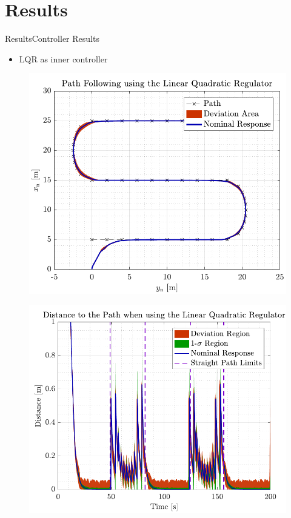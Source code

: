 \section{Results}

\begin{frame}{Results}{Controller Results}
\begin{itemize}
    \item LQR as inner controller
\end{itemize}
    \begin{minipage}{0.5\linewidth}
            \begin{figure}[H]
                \centering
                \includegraphics[width=1\linewidth]{figures/path_lqr}
            \end{figure}        
        \end{minipage}\hfill      
    \begin{minipage}{0.5\linewidth}
            \begin{figure}[H]
                \centering
                \includegraphics[width=1\linewidth]{figures/dist_lqr}

\end{figure}
\end{minipage}
\end{frame}
